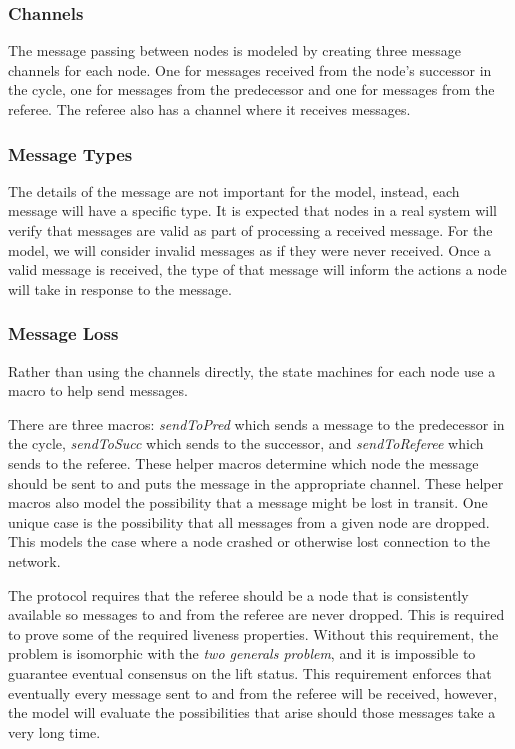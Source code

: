 \documentclass[runningheads]{llncs}
\newcommand{\spin}{Spin}
\newif\ifcomments
\newif\ifkylecomments
\newcommand{\egm}[1]{\ifcomments\textcolor{orange}{egm: #1}\fi}
\newcommand{\krs}[1]{\ifkylecomments\textcolor{blue}{krs: #1}\fi}
\begin{document}
\subsubsection{Channels}
The message passing between nodes is modeled by creating three message channels for each node. One for messages received from the node's successor in the cycle, one for messages from the predecessor and one for messages from the referee. The referee also has a channel where it receives messages.

\subsubsection{Message Types}
The details of the message are not important for the model, instead, each message will have a specific type. It is expected that nodes in a real system will verify that messages are valid as part of processing a received message. For the model, we will consider invalid messages as if they were never received. Once a valid message is received, the type of that message will inform the actions a node will take in response to the message.

\subsubsection{Message Loss}
Rather than using the channels directly, the state machines for each node use a macro to help send messages. 
\krs{Good catch. Fixed. \egm{In the following sentence, \spin\ does not have functions. It only has macros. Change the text to match.}}
There are three macros: \emph{sendToPred} which sends a message to the predecessor in the cycle, \emph{sendToSucc} which sends to the successor, and \emph{sendToReferee} which sends to the referee. These helper macros determine which node the message should be sent to and puts the message in the appropriate channel. These helper macros also model the possibility that a message might be lost in transit.  One unique case is the possibility that all messages from a given node are dropped. This models the case where a node crashed or otherwise lost connection to the network. 

The protocol requires that the referee should be a node that is consistently available so messages to and from the referee are never dropped. This is required to prove some of the required liveness properties. Without this requirement, the problem is isomorphic with the \emph{two generals problem}, and it is impossible to guarantee eventual consensus on the lift status. This requirement enforces that eventually every message sent to and from the referee will be received, however, the model will evaluate the possibilities that arise should those messages take a very long time. 
\end{document}
